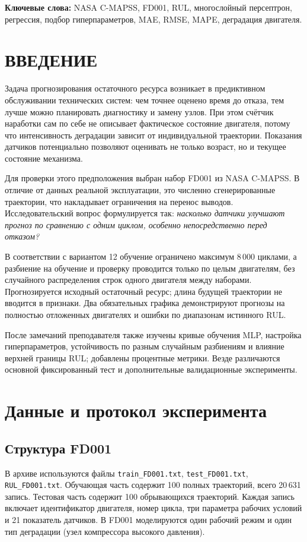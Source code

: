 \documentclass[12pt,a4paper]{article}
\begin{document}
\textbf{Ключевые слова:} NASA C-MAPSS, FD001, RUL, многослойный персептрон, регрессия, подбор гиперпараметров, MAE, RMSE, MAPE, деградация двигателя.
\newpage
\tableofcontents
\newpage
\section*{ВВЕДЕНИЕ}
Задача прогнозирования остаточного ресурса возникает в предиктивном обслуживании технических систем: чем точнее оценено время до отказа, тем лучше можно планировать диагностику и замену узлов. При этом счётчик наработки сам по себе не описывает фактическое состояние двигателя, потому что интенсивность деградации зависит от индивидуальной траектории. Показания датчиков потенциально позволяют оценивать не только возраст, но и текущее состояние механизма.

Для проверки этого предположения выбран набор FD001 из NASA C-MAPSS. В отличие от данных реальной эксплуатации, это численно сгенерированные траектории, что накладывает ограничения на перенос выводов. Исследовательский вопрос формулируется так: \emph{насколько датчики улучшают прогноз по сравнению с одним циклом, особенно непосредственно перед отказом?}

В соответствии с вариантом 12 обучение ограничено максимум 8\,000 циклами, а разбиение на обучение и проверку проводится только по целым двигателям, без случайного распределения строк одного двигателя между наборами. Прогнозируется исходный остаточный ресурс; длина будущей траектории не вводится в признаки. Два обязательных графика демонстрируют прогнозы на полностью отложенных двигателях и ошибки по диапазонам истинного RUL.

После замечаний преподавателя также изучены кривые обучения MLP, настройка гиперпараметров, устойчивость по разным случайным разбиениям и влияние верхней границы RUL; добавлены процентные метрики. Везде различаются основной фиксированный тест и дополнительные валидационные эксперименты.
\section{Данные и протокол эксперимента}
\subsection{Структура FD001}
В архиве используются файлы \texttt{train\_FD001.txt}, \texttt{test\_FD001.txt}, \texttt{RUL\_FD001.txt}. Обучающая часть содержит 100 полных траекторий, всего 20\,631 запись. Тестовая часть содержит 100 обрывающихся траекторий. Каждая запись включает идентификатор двигателя, номер цикла, три параметра рабочих условий и 21 показатель датчиков. В FD001 моделируются один рабочий режим и один тип деградации (узел компрессора высокого давления).
\end{document}

